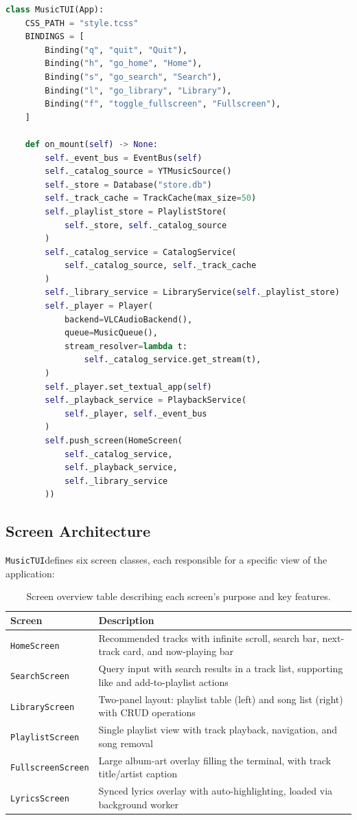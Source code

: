 \documentclass[a4paper,11pt,twoside]{article}
\newcommand{\musictui}{\texttt{MusicTUI}}
\newcommand{\homesc}{\texttt{HomeScreen}}
\newcommand{\searchsc}{\texttt{SearchScreen}}
\newcommand{\librarysc}{\texttt{LibraryScreen}}
\newcommand{\playlistsc}{\texttt{PlaylistScreen}}
\newcommand{\fullscreensc}{\texttt{FullscreenScreen}}
\newcommand{\lyricssc}{\texttt{LyricsScreen}}
\begin{document}
\begin{lstlisting}[language=Python, caption={Main application class wiring
all services together.}]
class MusicTUI(App):
    CSS_PATH = "style.tcss"
    BINDINGS = [
        Binding("q", "quit", "Quit"),
        Binding("h", "go_home", "Home"),
        Binding("s", "go_search", "Search"),
        Binding("l", "go_library", "Library"),
        Binding("f", "toggle_fullscreen", "Fullscreen"),
    ]

    def on_mount(self) -> None:
        self._event_bus = EventBus(self)
        self._catalog_source = YTMusicSource()
        self._store = Database("store.db")
        self._track_cache = TrackCache(max_size=50)
        self._playlist_store = PlaylistStore(
            self._store, self._catalog_source
        )
        self._catalog_service = CatalogService(
            self._catalog_source, self._track_cache
        )
        self._library_service = LibraryService(self._playlist_store)
        self._player = Player(
            backend=VLCAudioBackend(),
            queue=MusicQueue(),
            stream_resolver=lambda t:
                self._catalog_service.get_stream(t),
        )
        self._player.set_textual_app(self)
        self._playback_service = PlaybackService(
            self._player, self._event_bus
        )
        self.push_screen(HomeScreen(
            self._catalog_service,
            self._playback_service,
            self._library_service
        ))
\end{lstlisting}

\subsection{Screen Architecture}

\musictui defines six screen classes, each responsible for a specific
view of the application:

\begin{table}[H]
\centering
\small
\caption{Screen overview table describing each screen's purpose and key
features.}
\label{tab:screens}
\begin{tabularx}{\textwidth}{lX}
\toprule
\textbf{Screen} & \textbf{Description} \\
\midrule
\homesc & Recommended tracks with infinite scroll, search bar,
next-track card, and now-playing bar \\
\searchsc & Query input with search results in a track list, supporting
like and add-to-playlist actions \\
\librarysc & Two-panel layout: playlist table (left) and song list (right)
with CRUD operations \\
\playlistsc & Single playlist view with track playback, navigation, and
song removal \\
\fullscreensc & Large album-art overlay filling the terminal, with track
title/artist caption \\
\lyricssc & Synced lyrics overlay with auto-highlighting, loaded via
background worker \\
\bottomrule
\end{tabularx}

\end{table}
\end{document}
